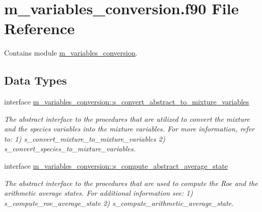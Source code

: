 \hypertarget{m__variables__conversion_8f90}{}\section{m\+\_\+variables\+\_\+conversion.\+f90 File Reference}
\label{m__variables__conversion_8f90}


Contains module \hyperlink{namespacem__variables__conversion}{m\+\_\+variables\+\_\+conversion}.  


\subsection*{Data Types}
\begin{DoxyCompactItemize}
\item 
interface \hyperlink{interfacem__variables__conversion_1_1s__convert__abstract__to__mixture__variables}{m\+\_\+variables\+\_\+conversion\+::s\+\_\+convert\+\_\+abstract\+\_\+to\+\_\+mixture\+\_\+variables}
\begin{DoxyCompactList}\small\item\em The abstract interface to the procedures that are utilized to convert the mixture and the species variables into the mixture variables. For more information, refer to\+: 1) s\+\_\+convert\+\_\+mixture\+\_\+to\+\_\+mixture\+\_\+variables 2) s\+\_\+convert\+\_\+species\+\_\+to\+\_\+mixture\+\_\+variables. \end{DoxyCompactList}\item 
interface \hyperlink{interfacem__variables__conversion_1_1s__compute__abstract__average__state}{m\+\_\+variables\+\_\+conversion\+::s\+\_\+compute\+\_\+abstract\+\_\+average\+\_\+state}
\begin{DoxyCompactList}\small\item\em The abstract interface to the procedures that are used to compute the Roe and the arithmetic average states. For additional information see\+: 1) s\+\_\+compute\+\_\+roe\+\_\+average\+\_\+state 2) s\+\_\+compute\+\_\+arithmetic\+\_\+average\+\_\+state. \end{DoxyCompactList}\end{DoxyCompactItemize}
